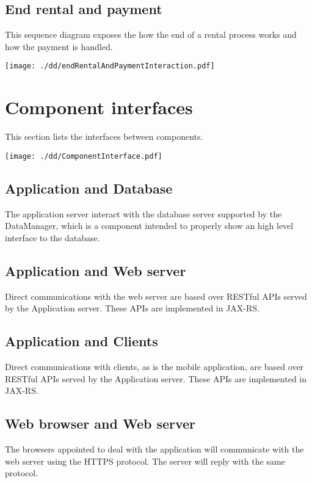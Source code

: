 \documentclass{scrreprt}
\begin{document}
\subsection{End rental and payment}
This sequence diagram exposes the how the end of a rental process works and how the payment is handled.
\begin{center}
		\texttt{[image: ./dd/endRentalAndPaymentInteraction.pdf]}
\end{center}

\section{Component interfaces}
This section lists the interfaces between components.
\begin{center}
		\texttt{[image: ./dd/ComponentInterface.pdf]}
\end{center}
\subsection{Application and Database}
The application server interact with the database server supported by the DataManager, which is a component intended to properly show an high level interface to the database.

\subsection{Application and Web server}
Direct communications with the web server are based over RESTful APIs served by the Application server. These APIs are implemented in JAX-RS.

\subsection{Application and Clients}
Direct communications with clients, as is the mobile application, are based over RESTful APIs served by the Application server. These APIs are implemented in JAX-RS.

\subsection{Web browser and Web server}
The browsers appointed to deal with the application will communicate with the web server using the HTTPS protocol. The server will reply with the same protocol.
\end{document}
